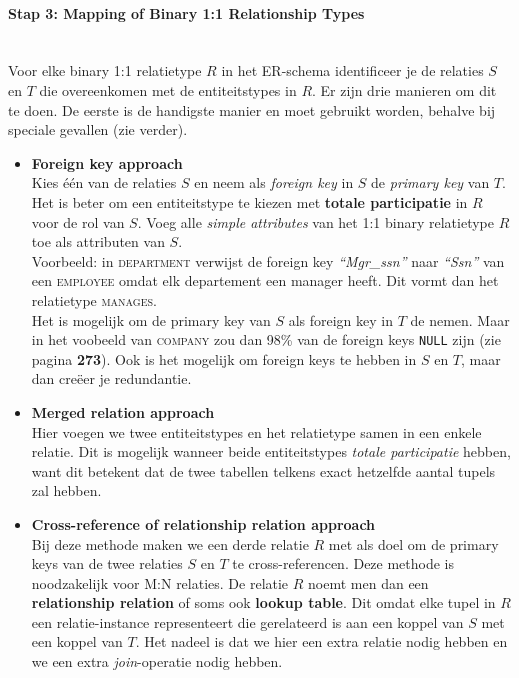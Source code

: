 \paragraph{Stap 3: Mapping of Binary 1:1 Relationship Types}~\vspace{2mm}\\
Voor elke binary 1:1 relatietype $R$ in het ER-schema identificeer je de relaties $S$ en $T$ die overeenkomen met de entiteitstypes in $R$. Er zijn drie manieren om dit te doen. De eerste is de handigste manier en moet gebruikt worden, behalve bij speciale gevallen (zie verder).
\begin{itemize}
 	\item \textbf{Foreign key approach}\\
	Kies \'e\'en van de relaties $S$ en neem als \textit{foreign key} in $S$ de \textit{primary key} van $T$. Het is beter om een entiteitstype te kiezen met \textbf{totale participatie} in $R$ voor de rol van $S$. Voeg alle \textit{simple attributes} van het 1:1 binary relatietype $R$ toe als attributen van $S$.\\
	Voorbeeld: in \textsc{department} verwijst de foreign key \textit{``Mgr\_ssn''} naar \textit{``Ssn''} van een \textsc{employee} omdat elk departement een manager heeft. Dit vormt dan het relatietype \textsc{manages}.\\
	Het is mogelijk om de primary key van $S$ als foreign key in $T$ de nemen. Maar in het voobeeld van \textsc{company} zou dan 98\% van de foreign keys \texttt{NULL} zijn (zie pagina \textbf{273}). Ook is het mogelijk om foreign keys te hebben in $S$ en $T$, maar dan cre\"eer je redundantie.

	\item \textbf{Merged relation approach}\\
	Hier voegen we twee entiteitstypes en het relatietype samen in een enkele relatie. Dit is mogelijk wanneer beide entiteitstypes \textit{totale participatie} hebben, want dit betekent dat de twee tabellen telkens exact hetzelfde aantal tupels zal hebben.
  
	\item \textbf{Cross-reference of relationship relation approach}\\
	Bij deze methode maken we een derde relatie $R$ met als doel om de primary keys van de twee relaties $S$ en $T$ te cross-referencen. Deze methode is noodzakelijk voor M:N relaties. De relatie $R$ noemt men dan een \textbf{relationship relation} of soms ook \textbf{lookup table}. Dit omdat elke tupel in $R$ een relatie-instance representeert die gerelateerd is aan een koppel van $S$ met een koppel van $T$. Het nadeel is dat we hier een extra relatie nodig hebben en we een extra \textit{join}-operatie nodig hebben.
\end{itemize}

